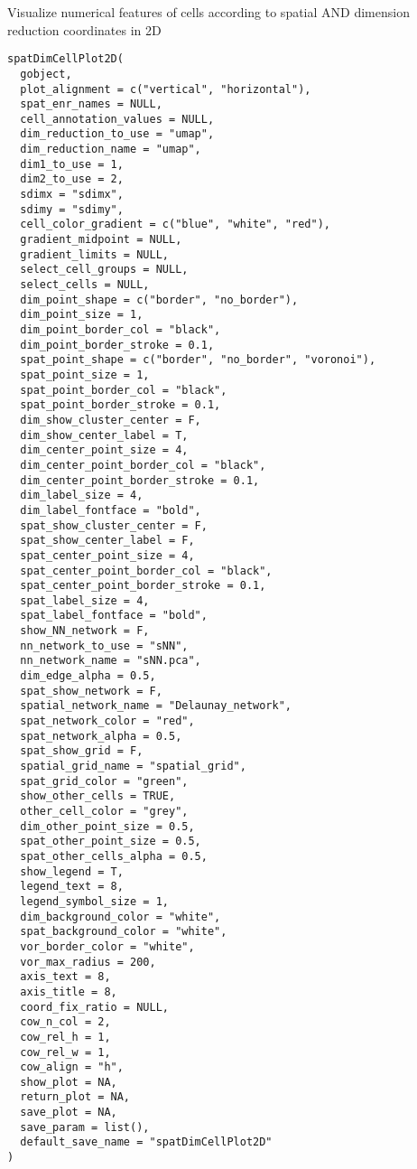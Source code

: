 \documentclass[a4paper]{book}
\begin{document}
%
\begin{Description}\relax
Visualize numerical features of cells according to spatial AND dimension reduction coordinates in 2D
\end{Description}
%
\begin{Usage}
\begin{verbatim}
spatDimCellPlot2D(
  gobject,
  plot_alignment = c("vertical", "horizontal"),
  spat_enr_names = NULL,
  cell_annotation_values = NULL,
  dim_reduction_to_use = "umap",
  dim_reduction_name = "umap",
  dim1_to_use = 1,
  dim2_to_use = 2,
  sdimx = "sdimx",
  sdimy = "sdimy",
  cell_color_gradient = c("blue", "white", "red"),
  gradient_midpoint = NULL,
  gradient_limits = NULL,
  select_cell_groups = NULL,
  select_cells = NULL,
  dim_point_shape = c("border", "no_border"),
  dim_point_size = 1,
  dim_point_border_col = "black",
  dim_point_border_stroke = 0.1,
  spat_point_shape = c("border", "no_border", "voronoi"),
  spat_point_size = 1,
  spat_point_border_col = "black",
  spat_point_border_stroke = 0.1,
  dim_show_cluster_center = F,
  dim_show_center_label = T,
  dim_center_point_size = 4,
  dim_center_point_border_col = "black",
  dim_center_point_border_stroke = 0.1,
  dim_label_size = 4,
  dim_label_fontface = "bold",
  spat_show_cluster_center = F,
  spat_show_center_label = F,
  spat_center_point_size = 4,
  spat_center_point_border_col = "black",
  spat_center_point_border_stroke = 0.1,
  spat_label_size = 4,
  spat_label_fontface = "bold",
  show_NN_network = F,
  nn_network_to_use = "sNN",
  nn_network_name = "sNN.pca",
  dim_edge_alpha = 0.5,
  spat_show_network = F,
  spatial_network_name = "Delaunay_network",
  spat_network_color = "red",
  spat_network_alpha = 0.5,
  spat_show_grid = F,
  spatial_grid_name = "spatial_grid",
  spat_grid_color = "green",
  show_other_cells = TRUE,
  other_cell_color = "grey",
  dim_other_point_size = 0.5,
  spat_other_point_size = 0.5,
  spat_other_cells_alpha = 0.5,
  show_legend = T,
  legend_text = 8,
  legend_symbol_size = 1,
  dim_background_color = "white",
  spat_background_color = "white",
  vor_border_color = "white",
  vor_max_radius = 200,
  axis_text = 8,
  axis_title = 8,
  coord_fix_ratio = NULL,
  cow_n_col = 2,
  cow_rel_h = 1,
  cow_rel_w = 1,
  cow_align = "h",
  show_plot = NA,
  return_plot = NA,
  save_plot = NA,
  save_param = list(),
  default_save_name = "spatDimCellPlot2D"
)
\end{verbatim}
\end{Usage}
\end{document}
